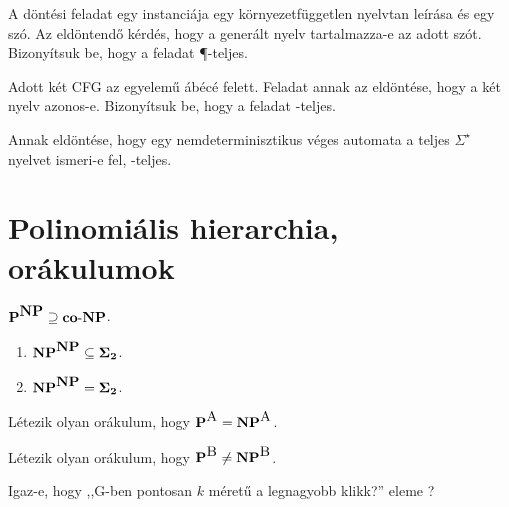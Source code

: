 \begin{Exercise}[counter={sorszam}, difficulty=0]
A  döntési feladat egy instanciája egy környezetfüggetlen nyelvtan leírása és egy szó. Az eldöntendő kérdés, hogy a generált nyelv tartalmazza-e az adott szót. Bizonyítsuk be, hogy a feladat \P-teljes.
\end{Exercise}


\begin{Exercise}[counter={sorszam}, difficulty=0]
Adott két CFG az egyelemű ábécé felett. Feladat annak az eldöntése, hogy a két nyelv azonos-e. Bizonyítsuk be, hogy a feladat \Sigmatwo-teljes.
\end{Exercise}


\begin{Exercise}[counter={sorszam}, difficulty=1]
Annak eldöntése, hogy egy nemdeterminisztikus véges automata a teljes $\Sigma ^ \star$ nyelvet
ismeri-e fel, \PSPACE-teljes. 
\end{Exercise}



\chapter{Polinomiális hierarchia, orákulumok}

\begin{Exercise}[counter={sorszam}, difficulty=0]
$\mbox{\ensuremath{\mathbf{P}}}^{\mbox{\ensuremath{\mathbf{NP}}}} \supseteq \mbox{\ensuremath{\mathbf{co\text{-}NP}}}$.
\end{Exercise}


\begin{Exercise}[counter={sorszam}, difficulty=0]
\begin{enumerate}
 \item $\mbox{\ensuremath{\mathbf{NP}}}^{\mbox{\ensuremath{\mathbf{NP}}}} \subseteq \mbox{\ensuremath{\mathbf{\Sigma_2}}}$.
 \item \hard $\mbox{\ensuremath{\mathbf{NP}}}^{\mbox{\ensuremath{\mathbf{NP}}}} = \mbox{\ensuremath{\mathbf{\Sigma_2}}}$.
\end{enumerate}
\end{Exercise}


\begin{Exercise}[counter={sorszam}, difficulty=0]
Létezik olyan  orákulum, hogy $\mbox{\ensuremath{\mathbf{P}}}^{\mbox{\sc{A}}} = \mbox{\ensuremath{\mathbf{NP}}}^{\mbox{\sc{A}}}$.
\end{Exercise}


\begin{Exercise}[counter={sorszam}, difficulty=0]
Létezik olyan  orákulum, hogy $\mbox{\ensuremath{\mathbf{P}}}^{\mbox{\sc{B}}} \neq \mbox{\ensuremath{\mathbf{NP}}}^{\mbox{\sc{B}}}$.
\end{Exercise}


\begin{Exercise}[counter={sorszam}, difficulty=0]
Igaz-e, hogy ,,G-ben pontosan $k$ méretű a legnagyobb klikk?'' eleme \Sigmatwo?
\end{Exercise}



